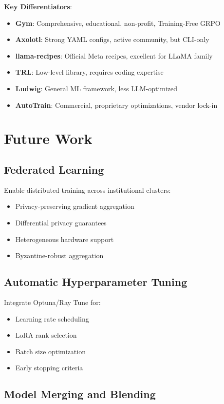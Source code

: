 \documentclass[11pt,letterpaper]{article}
\begin{document}
\textbf{Key Differentiators}:
\begin{itemize}
\item \textbf{Gym}: Comprehensive, educational, non-profit, Training-Free GRPO
\item \textbf{Axolotl}: Strong YAML configs, active community, but CLI-only
\item \textbf{llama-recipes}: Official Meta recipes, excellent for LLaMA family
\item \textbf{TRL}: Low-level library, requires coding expertise
\item \textbf{Ludwig}: General ML framework, less LLM-optimized
\item \textbf{AutoTrain}: Commercial, proprietary optimizations, vendor lock-in
\end{itemize}

\section{Future Work}

\subsection{Federated Learning}

Enable distributed training across institutional clusters:
\begin{itemize}
\item Privacy-preserving gradient aggregation
\item Differential privacy guarantees
\item Heterogeneous hardware support
\item Byzantine-robust aggregation
\end{itemize}

\subsection{Automatic Hyperparameter Tuning}

Integrate Optuna/Ray Tune for:
\begin{itemize}
\item Learning rate scheduling
\item LoRA rank selection
\item Batch size optimization
\item Early stopping criteria
\end{itemize}

\subsection{Model Merging and Blending}
\end{document}
